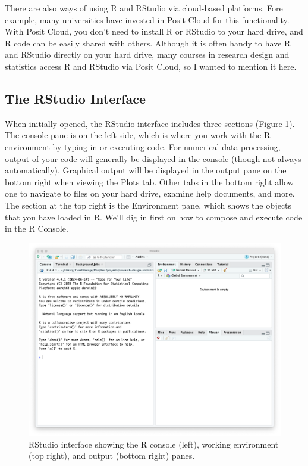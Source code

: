 \documentclass[
]{book}
\begin{document}
There are also ways of using R and RStudio via cloud-based platforms. Fore example, many universities have invested in \href{https://posit.cloud}{Posit Cloud} for this functionality. With Posit Cloud, you don't need to install R or RStudio to your hard drive, and R code can be easily shared with others. Although it is often handy to have R and RStudio directly on your hard drive, many courses in research design and statistics access R and RStudio via Posit Cloud, so I wanted to mention it here.

\subsection{The RStudio Interface}\label{the-rstudio-interface}

When initially opened, the RStudio interface includes three sections (Figure \ref{fig:c3c1}). The console pane is on the left side, which is where you work with the R environment by typing in or executing code. For numerical data processing, output of your code will generally be displayed in the console (though not always automatically). Graphical output will be displayed in the output pane on the bottom right when viewing the Plots tab. Other tabs in the bottom right allow one to navigate to files on your hard drive, examine help documents, and more. The section at the top right is the Environment pane, which shows the objects that you have loaded in R. We'll dig in first on how to compose and execute code in the R Console.

\begin{figure}

{\centering \includegraphics[width=0.8\linewidth]{images/03_rStudio} 

}

\caption{RStudio interface showing the R console (left), working environment (top right), and output (bottom right) panes.}\label{fig:c3c1}
\end{figure}
\end{document}
